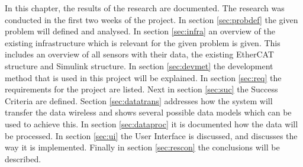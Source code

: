 In this chapter, the results of the research are documented. The research was conducted in the first two weeks of the project. In section \ref{sec:probdef} the given problem will defined and analysed. In section \ref{sec:infra} an overview of the existing infrastructure which is relevant for the given problem is given. This includes an overview of all sensors with their data, the existing EtherCAT structure and Simulink structure. In section \ref{sec:devmet} the development method that is used in this project will be explained. In section \ref{sec:req} the requirements for the project are listed. Next in section \ref{sec:suc} the Success Criteria are defined. Section \ref{sec:datatrans} addresses how the system will transfer the data wireless and shows several possible data models which can be used to achieve this. In section \ref{sec:dataproc} it is documented how the data will be processed. In section \ref{sec:ui} the User Interface is discussed, and discusses the way it is implemented. Finally in section \ref{sec:rescon} the conclusions will be described.